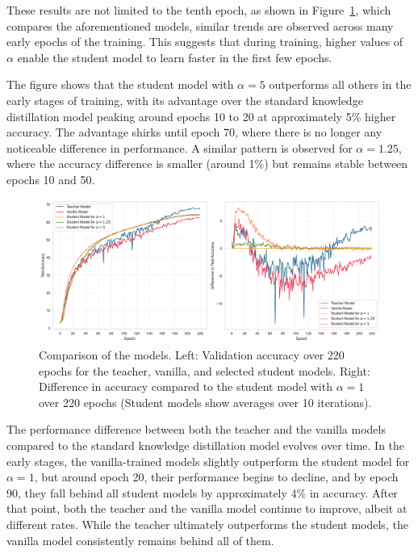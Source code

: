These results are not limited to the tenth epoch, as shown in Figure~\ref{fig:exp1_line_and_diff_plot}, which compares the aforementioned models, similar trends are observed across many early epochs of the training. This suggests that during training, higher values of $\alpha$ enable the student model to learn faster in the first few epochs.

The figure shows that the student model with $\alpha = 5$ outperforms all others in the early stages of training, with its advantage over the standard knowledge distillation model peaking around epochs 10 to 20 at approximately 5\% higher accuracy. The advantage shirks until epoch 70, where there is no longer any noticeable difference in performance. A similar pattern is observed for $\alpha = 1.25$, where the accuracy difference is smaller (around 1\%) but remains stable between epochs 10 and 50.

\begin{figure}[h!]
	\centering
	\includegraphics[width=1\textwidth]{../img/exp1_line_and_diff_plot.pdf}
	\caption{Comparison of the models. Left: Validation accuracy over 220 epochs for the teacher, vanilla, and selected student models. Right: Difference in accuracy compared to the student model with $\alpha=1$ over 220 epochs (Student models show averages over 10 iterations).}
	\label{fig:exp1_line_and_diff_plot}
\end{figure}

The performance difference between both the teacher and the vanilla models compared to the standard knowledge distillation model evolves over time. In the early stages, the vanilla-trained models slightly outperform the student model for $\alpha=1$, but around epoch 20, their performance begins to decline, and by epoch 90, they fall behind all student models by approximately 4\% in accuracy. After that point, both the teacher and the vanilla model continue to improve, albeit at different rates. While the teacher ultimately outperforms the student models, the vanilla model consistently remains behind all of them.

